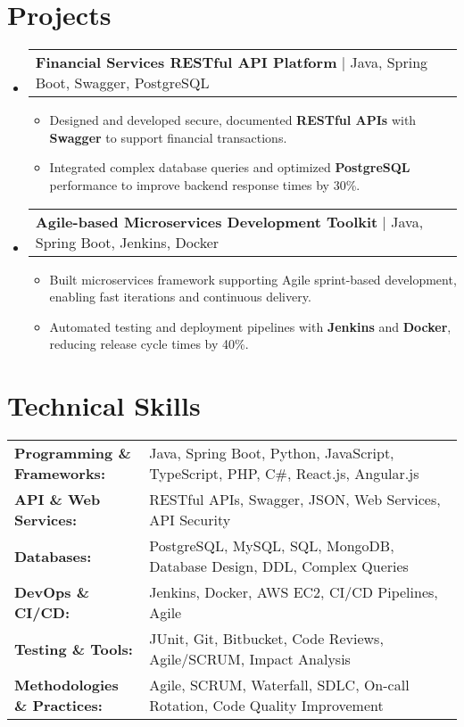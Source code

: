 \documentclass[letterpaper,11pt]{article}
\makeatletter
\newcommand{\resumeItem}[1]{
  \item\footnotesize{
    {#1 \vspace{-2pt}}
  }
}
\newcommand{\resumeProjectHeading}[2]{
    \item
    \begin{tabular*}{1.001\textwidth}{l@{\extracolsep{\fill}}r}
      \small#1 & \textbf{\small #2}\\
    \end{tabular*}\vspace{-7pt}
}
\newcommand{\resumeSubHeadingListStart}{\begin{itemize}[leftmargin=0pt, label={}]}
\newcommand{\resumeSubHeadingListEnd}{\end{itemize}}
\newcommand{\resumeItemListStart}{\begin{itemize}[leftmargin=*]}
\newcommand{\resumeItemListEnd}{\end{itemize}\vspace{-5pt}}
\makeatother
\begin{document}
\section{Projects}
    \vspace{-5pt}
    \resumeSubHeadingListStart
      \resumeProjectHeading
          {\textbf{Financial Services RESTful API Platform} | Java, Spring Boot, Swagger, PostgreSQL}{}
          \resumeItemListStart
              \resumeItem{Designed and developed secure, documented \textbf{RESTful APIs} with \textbf{Swagger} to support financial transactions.}
              \resumeItem{Integrated complex database queries and optimized \textbf{PostgreSQL} performance to improve backend response times by 30\%.}
          \resumeItemListEnd
          \vspace{-16pt}
      \resumeProjectHeading
          {\textbf{Agile-based Microservices Development Toolkit} | Java, Spring Boot, Jenkins, Docker}{}
          \resumeItemListStart
              \resumeItem{Built microservices framework supporting Agile sprint-based development, enabling fast iterations and continuous delivery.}
              \resumeItem{Automated testing and deployment pipelines with \textbf{Jenkins} and \textbf{Docker}, reducing release cycle times by 40\%.}
          \resumeItemListEnd
          \vspace{-16pt}
    \resumeSubHeadingListEnd
\vspace{-10pt}
\section{Technical Skills}
        \vspace{-14pt}
        \begin{table}[h]
            \footnotesize
            \begin{tabular}{p{0.3\linewidth} p{0.7\linewidth}}
                \textbf{Programming \& Frameworks:} & Java, Spring Boot, Python, JavaScript, TypeScript, PHP, C\#, React.js, Angular.js \\
                \textbf{API \& Web Services:} & RESTful APIs, Swagger, JSON, Web Services, API Security \\
                \textbf{Databases:} & PostgreSQL, MySQL, SQL, MongoDB, Database Design, DDL, Complex Queries \\
                \textbf{DevOps \& CI/CD:} & Jenkins, Docker, AWS EC2, CI/CD Pipelines, Agile \\
                \textbf{Testing \& Tools:} & JUnit, Git, Bitbucket, Code Reviews, Agile/SCRUM, Impact Analysis \\
                \textbf{Methodologies \& Practices:} & Agile, SCRUM, Waterfall, SDLC, On-call Rotation, Code Quality Improvement \\
            \end{tabular}
        \end{table}
\end{document}
